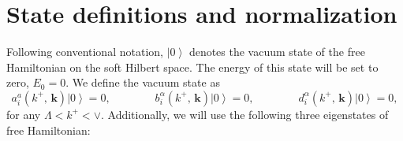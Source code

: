 \documentclass[aps,prd,amsmath,amssymb,nofootinbib]{revtex4-2}
\numberwithin{equation}{section}
\begin{document}
\section{State definitions and normalization}\label{sec:defn}
Following conventional notation, $\left|0\right\rangle$ denotes the vacuum state of the free Hamiltonian on the soft Hilbert space.
The energy of this state will be set to zero, $E_{0}=0$. 
We define the vacuum state as 
\begin{equation}
 a_{i}^{a}(k^{+},\, \mathbf{k})\left|0\right\rangle =0,\qquad\qquad b_{i}^{\alpha}(k^{+},\, \mathbf{k})\left|0\right\rangle =0,\qquad\qquad d_{i}^{\alpha}(k^{+},\, \mathbf{k})\left|0\right\rangle =0,
\end{equation}
for any $\Lambda<k^{+}<\vee$. 
Additionally, we will use the following three eigenstates of free Hamiltonian:\\
\end{document}
